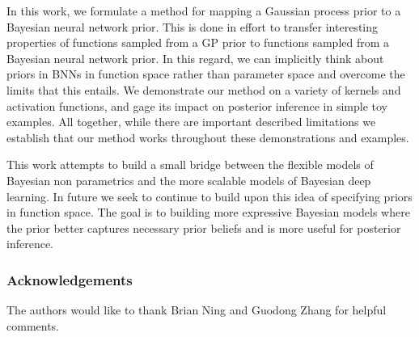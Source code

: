 \documentclass{article}
\begin{document}
In this work, we formulate a method for mapping a Gaussian process prior to a Bayesian neural network prior. 
This is done in effort to transfer interesting properties of functions sampled from a GP prior to functions
sampled from a Bayesian neural network prior. In this regard, we can implicitly think about priors in BNNs 
in function space rather than parameter space and overcome the limits that this entails. We demonstrate our method 
on a variety of kernels and activation functions, and gage its impact on posterior inference in simple toy examples.
All together, while there are important described limitations we establish that our method works throughout these
demonstrations and examples.                                                                                                                                                                                                                                                                                                          

This work attempts to build a small bridge between the flexible models of Bayesian non parametrics and the 
more scalable models of Bayesian deep learning. In future we seek to continue to build upon this idea of specifying 
priors in function space. The goal is to building more expressive Bayesian models where the prior 
better captures necessary prior beliefs and is more useful for posterior inference.  


\newpage

\subsubsection*{Acknowledgements}

The authors would like to thank Brian Ning and Guodong Zhang for helpful comments.




\end{document}
